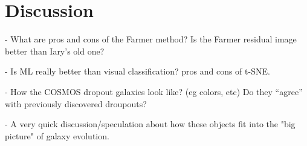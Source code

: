 \section{Discussion}

- What are pros and cons of the Farmer method? Is the Farmer residual image better than Iary's old one?

- Is ML really better than visual classification? pros and cons of t-SNE.

- How the COSMOS dropout galaxies look like? (eg colors, etc) 
Do they ``agree'' with previously discovered droupouts?

- A very quick discussion/speculation about how these objects fit into the "big picture" of galaxy evolution. 


